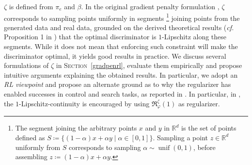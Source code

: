 $\zeta$ is defined from $\pi_e$ and $\beta$.
In the original gradient penalty formulation \cite{Gulrajani2017-mr},
$\zeta$ corresponds to sampling points uniformly in segments
\footnote{The segment joining the arbitrary points $x$ and $y$ in $\mathbb{R}^d$
is the set of points defined as
$S \coloneqq \{(1 - \alpha)x + \alpha y \; | \; \alpha \in [0, 1] \}$.
Sampling a point $z \in \mathbb{R}^d$ uniformly from $S$ corresponds to
sampling $\alpha \sim \operatorname{unif}(0,1)$,
before assembling $z \coloneqq (1 - \alpha)x + \alpha y$.}
joining points from the generated data and real data,
grounded on the derived theoretical results (\textit{cf.} Proposition 1 in \cite{Gulrajani2017-mr})
that the optimal discriminator is
$1$-Lipschitz along these segments.
While it does not mean that enforcing such constraint will make the discriminator optimal,
it yields good results in practice.
We discuss several formulations of $\zeta$ in \textsc{Section}~\ref{gradpenrl},
evaluate them empirically and propose intuitive arguments explaining the obtained results.
In particular, we adopt an \emph{RL viewpoint} and propose an alternate
ground as to why the regularizer has enabled successes in
control and search tasks, as reported in \cite{Blonde2019-vc,Kostrikov2019-jo}.
In particular, in \cite{Gulrajani2017-mr},
the $1$-Lipschitz-continuity is encouraged
by using $\mathfrak{R}_\varphi^\zeta (1)$ as regularizer.

